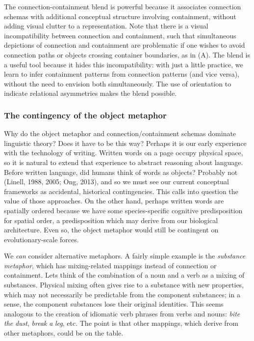   The connection-containment blend is powerful because it associates connection schemas with additional conceptual structure involving containment, without adding visual clutter to a representation. Note that there is a visual incompatibility between connection and containment, such that simultaneous depictions of connection and containment are problematic if one wishes to avoid connection paths or objects crossing container boundaries, as in (A). The blend is a useful tool because it hides this incompatibility: with just a little practice, we learn to infer containment patterns from connection patterns (and vice versa), without the need to envision both simultaneously. The use of orientation to indicate relational asymmetries makes the blend possible.

\subsubsection{{\textbf{The contingency of the object metaphor}}}

Why do the object metaphor and connection/containment schemas dominate linguistic theory? Does it have to be this way? Perhaps it is our early experience with the technology of writing. Written words on a page occupy physical space, so it is natural to extend that experience to abstract reasoning about language. Before written language, did humans think of words as objects? Probably not (Linell, 1988, 2005; Ong, 2013), and so we must see our current conceptual frameworks as accidental, historical contingencies. This calls into question the value of those approaches. On the other hand, perhaps written words are spatially ordered because we have some species-specific cognitive predisposition for spatial order, a predisposition which may derive from our biological architecture. Even so, the object metaphor would still be contingent on evolutionary-scale forces. 

  We \textit{can} consider alternative metaphors. A fairly simple example is the \textit{substance} \textit{metaphor}, which has mixing-related mappings instead of connection or containment. Lets think of the combination of a noun and a verb as a mixing of substances. Physical mixing often gives rise to a substance with new properties, which may not necessarily be predictable from the component substances; in a sense, the component substances lose their original identities. This seems analogous to the creation of idiomatic verb phrases from verbs and nouns: \textit{bite} \textit{the} \textit{dust}, \textit{break} \textit{a} \textit{leg}, etc. The point is that other mappings, which derive from other metaphors, could be on the table.

